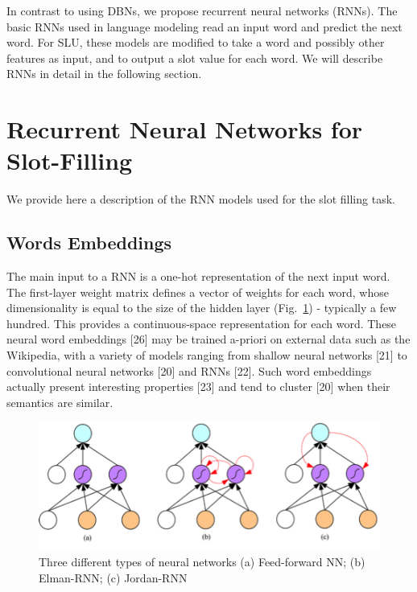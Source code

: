 In contrast to using DBNs, we propose recurrent neural networks (RNNs). The
basic RNNs used in language modeling read an input word and predict the next
word. For SLU, these models are modified to take a word and possibly other
features as input, and to output a slot value for each word. We will describe
RNNs in detail in the following section. 

\section{Recurrent Neural Networks for Slot-Filling}
\label{sec:rnnsf}

We provide here a description of the RNN models used for the slot filling task. 

\subsection{Words Embeddings}

The main input to a RNN is a one-hot representation of the next input word. The
first-layer weight matrix defines a vector of weights for each word, whose
dimensionality is equal to the size of the hidden layer (Fig.~\ref{fig:rnn}) - typically a
few hundred. This provides a continuous-space representation for each word.
These neural word embeddings [26] may be trained a-priori on external data such
as the Wikipedia, with a variety of models ranging from shallow neural networks
[21] to convolutional neural networks [20] and RNNs [22]. Such word embeddings
actually present interesting properties [23] and tend to cluster [20] when
their semantics are similar.

\begin{figure}[t]
\begin{center}
\includegraphics[width=.8\linewidth]{article4/images/rnn.png}
\caption{\label{fig:rnn} Three different types of neural networks 
(a) Feed-forward NN; (b) Elman-RNN; (c) Jordan-RNN}
\vspace{-0.2in}
\end{center}
\vspace*{-1mm}
\end{figure}


